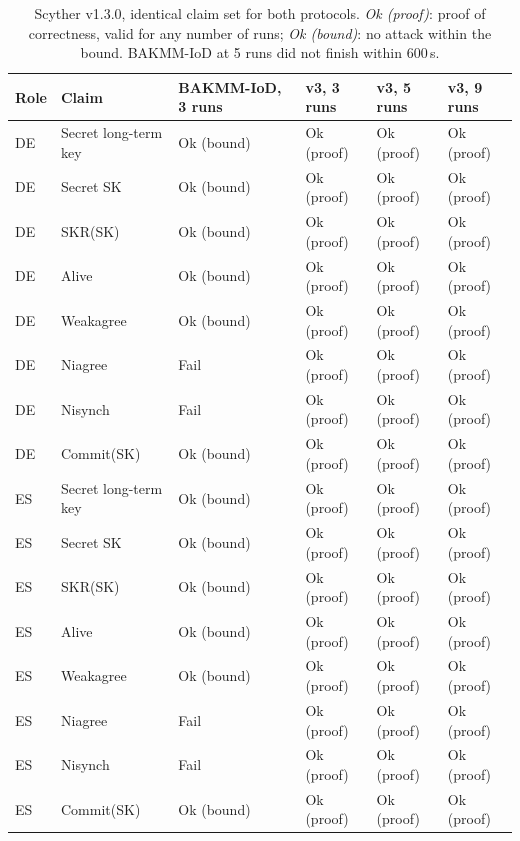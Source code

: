 \begin{table}[!t]
\centering
\footnotesize
\caption{Scyther v1.3.0, identical claim set for both protocols. \emph{Ok (proof)}: proof of correctness, valid for any number of runs; \emph{Ok (bound)}: no attack within the bound. BAKMM-IoD at 5 runs did not finish within 600\,s.}
\label{tab:scyther}
\setlength{\tabcolsep}{3pt}
\begin{tabular}{llllll}
\toprule
Role & Claim & BAKMM-IoD, 3 runs & v3, 3 runs & v3, 5 runs & v3, 9 runs \\
\midrule
DE & Secret long-term key & Ok (bound) & Ok (proof) & Ok (proof) & Ok (proof) \\
DE & Secret SK & Ok (bound) & Ok (proof) & Ok (proof) & Ok (proof) \\
DE & SKR(SK) & Ok (bound) & Ok (proof) & Ok (proof) & Ok (proof) \\
DE & Alive & Ok (bound) & Ok (proof) & Ok (proof) & Ok (proof) \\
DE & Weakagree & Ok (bound) & Ok (proof) & Ok (proof) & Ok (proof) \\
DE & Niagree & Fail & Ok (proof) & Ok (proof) & Ok (proof) \\
DE & Nisynch & Fail & Ok (proof) & Ok (proof) & Ok (proof) \\
DE & Commit(SK) & Ok (bound) & Ok (proof) & Ok (proof) & Ok (proof) \\
ES & Secret long-term key & Ok (bound) & Ok (proof) & Ok (proof) & Ok (proof) \\
ES & Secret SK & Ok (bound) & Ok (proof) & Ok (proof) & Ok (proof) \\
ES & SKR(SK) & Ok (bound) & Ok (proof) & Ok (proof) & Ok (proof) \\
ES & Alive & Ok (bound) & Ok (proof) & Ok (proof) & Ok (proof) \\
ES & Weakagree & Ok (bound) & Ok (proof) & Ok (proof) & Ok (proof) \\
ES & Niagree & Fail & Ok (proof) & Ok (proof) & Ok (proof) \\
ES & Nisynch & Fail & Ok (proof) & Ok (proof) & Ok (proof) \\
ES & Commit(SK) & Ok (bound) & Ok (proof) & Ok (proof) & Ok (proof) \\
\bottomrule
\end{tabular}
\end{table}
